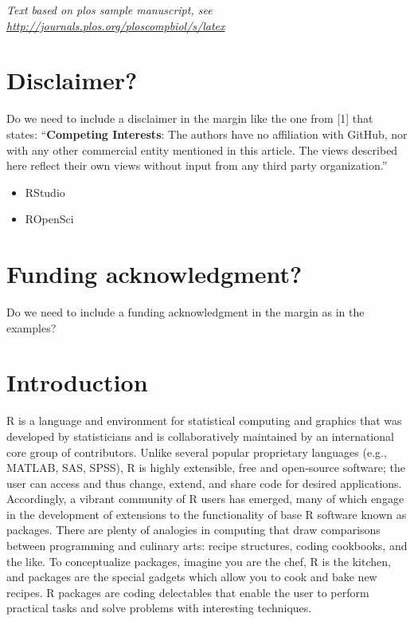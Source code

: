 \documentclass[10pt,letterpaper]{article}
\providecommand{\tightlist}{%
  \setlength{\itemsep}{0pt}\setlength{\parskip}{0pt}}
\begin{document}
\linenumbers

\emph{Text based on plos sample manuscript, see
\url{http://journals.plos.org/ploscompbiol/s/latex}}

\hypertarget{disclaimer}{%
\section{Disclaimer?}\label{disclaimer}}

Do we need to include a disclaimer in the margin like the one from
{[}1{]} that states: ``\textbf{Competing Interests}: The authors have no
affiliation with GitHub, nor with any other commercial entity mentioned
in this article. The views described here reflect their own views
without input from any third party organization.''

\begin{itemize}
\tightlist
\item
  RStudio
\item
  ROpenSci
\end{itemize}

\hypertarget{funding-acknowledgment}{%
\section{Funding acknowledgment?}\label{funding-acknowledgment}}

Do we need to include a funding acknowledgment in the margin as in the
examples?

\hypertarget{introduction}{%
\section{Introduction}\label{introduction}}

R is a language and environment for statistical computing and graphics
that was developed by statisticians and is collaboratively maintained by
an international core group of contributors. Unlike several popular
proprietary languages (e.g., MATLAB, SAS, SPSS), R is highly extensible,
free and open-source software; the user can access and thus change,
extend, and share code for desired applications. Accordingly, a vibrant
community of R users has emerged, many of which engage in the
development of extensions to the functionality of base R software known
as packages. There are plenty of analogies in computing that draw
comparisons between programming and culinary arts: recipe structures,
coding cookbooks, and the like. To conceptualize packages, imagine you
are the chef, R is the kitchen, and packages are the special gadgets
which allow you to cook and bake new recipes. R packages are coding
delectables that enable the user to perform practical tasks and solve
problems with interesting techniques.
\end{document}
